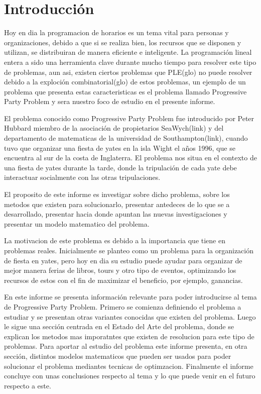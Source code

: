 \documentclass[spanish, fleqn]{article}
\begin{document}
\section{Introducción}

Hoy en dia la programacion de horarios es un tema vital para personas y organizaciones, debido a que si se realiza bien, los recursos que se disponen y utilizan, se distribuiran de manera eficiente e inteligente. La programación lineal entera a sido una herramienta clave durante mucho tiempo para resolver este tipo de problemas, aun asi, existen ciertos problemas que PLE(glo) no puede resolver debido a la exploción combinatorial(glo) de estos problemas, un ejemplo de un problema que presenta estas caracteristicas es el problema llamado Progressive Party Problem y sera nuestro foco de estudio en el presente informe.

El problema conocido como Progressive Party Problem fue introducido por Peter Hubbard miembro de la asociación de propietarios SeaWych(link) y del departamento de matematicas de la universidad de Southampton(link), cuando tuvo que organizar una fiesta de yates en la isla Wight el años 1996, que se encuentra al sur de la costa de Inglaterra. El problema nos situa en el contexto de una fiesta de yates durante la tarde, donde la tripulación de cada yate debe interactuar socialmente con las otras tripulaciones. 

El proposito de este informe es investigar sobre dicho problema, sobre los metodos que existen para solucionarlo, presentar antedeces de lo que se a desarrollado, presentar hacia donde apuntan las nuevas investigaciones y presentar un modelo matematico del problema.

La motivacion de este problema es debido a la importancia que tiene en problemas reales. Inicialmente se planteo como un problema para la organización de fiesta en yates, pero hoy en dia su estudio puede ayudar para organizar de mejor manera ferias de libros, tours y otro tipo de eventos, optimizando los recursos de estos con el fin de maximizar el beneficio, por ejemplo, ganancias.

En este informe se presenta información relevante para poder introducirse al tema de Progressive Party Problem. Primero se comienza definiendo el problema a estudiar y se presentan otras variantes conocidas que existen del problema. Luego le sigue una sección centrada en el Estado del Arte del problema, donde se explican los metodos mas imporatntes que existen de resolucion para este tipo de problemas. Para aportar al estudio del problema este informe presenta, en otra sección, distintos modelos matematicos que pueden ser usados para poder solucionar el problema mediantes tecnicas de optimzacion. Finalmente el informe concluye con unas conclusiones respecto al tema y lo que puede venir en el futuro respecto a este.
\end{document}
